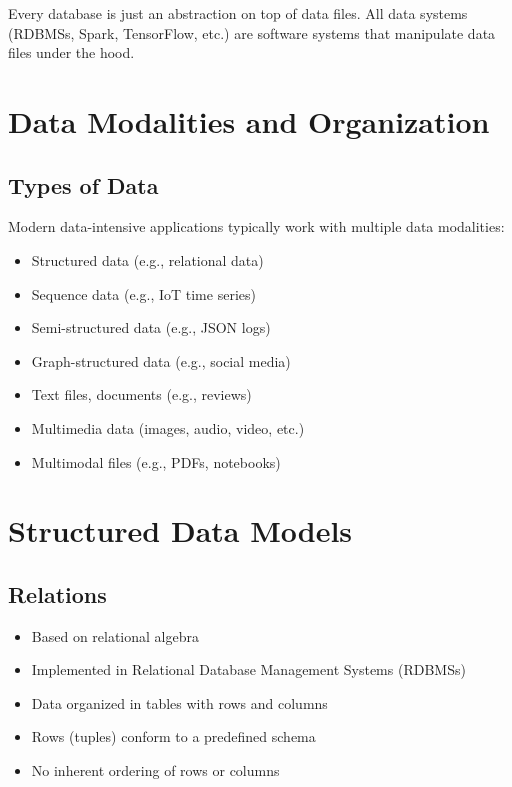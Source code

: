 \documentclass[12pt]{article}
\begin{document}
\begin{tcolorbox}[colback=yellow!5!white,colframe=yellow!75!black,title=Key Insight]
Every database is just an abstraction on top of data files. All data systems (RDBMSs, Spark, TensorFlow, etc.) are software systems that manipulate data files under the hood.
\end{tcolorbox}

\section{Data Modalities and Organization}

\subsection{Types of Data}
Modern data-intensive applications typically work with multiple data modalities:

\begin{itemize}
    \item Structured data (e.g., relational data)
    \item Sequence data (e.g., IoT time series)
    \item Semi-structured data (e.g., JSON logs)
    \item Graph-structured data (e.g., social media)
    \item Text files, documents (e.g., reviews)
    \item Multimedia data (images, audio, video, etc.)
    \item Multimodal files (e.g., PDFs, notebooks)
\end{itemize}

\section{Structured Data Models}

\subsection{Relations}
\begin{itemize}
    \item Based on relational algebra
    \item Implemented in Relational Database Management Systems (RDBMSs)
    \item Data organized in tables with rows and columns
    \item Rows (tuples) conform to a predefined schema
    \item No inherent ordering of rows or columns
\end{itemize}
\end{document}
